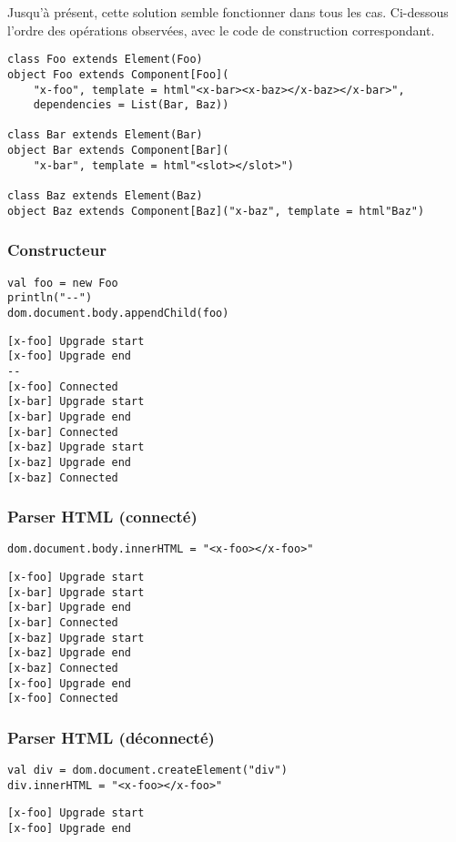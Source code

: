 Jusqu'à présent, cette solution semble fonctionner dans tous les cas. Ci-dessous l'ordre des opérations observées, avec le code de construction correspondant.

\begin{lstlisting}
class Foo extends Element(Foo)
object Foo extends Component[Foo](
	"x-foo", template = html"<x-bar><x-baz></x-baz></x-bar>",
	dependencies = List(Bar, Baz))

class Bar extends Element(Bar)
object Bar extends Component[Bar](
	"x-bar", template = html"<slot></slot>")

class Baz extends Element(Baz)
object Baz extends Component[Baz]("x-baz", template = html"Baz")
\end{lstlisting}

\subsubsection{Constructeur}
\begin{lstlisting}
val foo = new Foo
println("--")
dom.document.body.appendChild(foo)
\end{lstlisting}

\begin{lstlisting}
[x-foo] Upgrade start
[x-foo] Upgrade end
--
[x-foo] Connected
[x-bar] Upgrade start
[x-bar] Upgrade end
[x-bar] Connected
[x-baz] Upgrade start
[x-baz] Upgrade end
[x-baz] Connected
\end{lstlisting}

\subsubsection{Parser HTML (connecté)}
\begin{lstlisting}
dom.document.body.innerHTML = "<x-foo></x-foo>"
\end{lstlisting}

\begin{lstlisting}
[x-foo] Upgrade start
[x-bar] Upgrade start
[x-bar] Upgrade end
[x-bar] Connected
[x-baz] Upgrade start
[x-baz] Upgrade end
[x-baz] Connected
[x-foo] Upgrade end
[x-foo] Connected
\end{lstlisting}


\subsubsection{Parser HTML (déconnecté)}
\begin{lstlisting}
val div = dom.document.createElement("div")
div.innerHTML = "<x-foo></x-foo>"
\end{lstlisting}

\begin{lstlisting}
[x-foo] Upgrade start
[x-foo] Upgrade end
\end{lstlisting}
